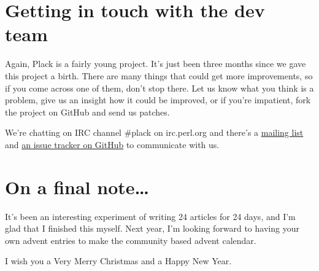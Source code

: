 \section{Getting in touch with the dev
team}\label{getting-in-touch-with-the-dev-team}

Again, Plack is a fairly young project. It's just been three months since we
gave this project a birth. There are many things that could get more
improvements, so if you come across one of them, don't stop there. Let
us know what you think is a problem, give us an insight how it could be
improved, or if you're impatient, fork the project on GitHub and send us
patches.

We're chatting on IRC channel \#plack on irc.perl.org and there's a
\href{http://groups.google.com/group/psgi-plack}{mailing list} and
\href{http://github.com/plack/Plack/issues}{an issue tracker on GitHub}
to communicate with us.

\section{On a final note\ldots{}}\label{on-a-final-note}

It's been an interesting experiment of writing 24 articles for 24 days,
and I'm glad that I finished this myself. Next year, I'm looking forward
to having your own advent entries to make the community based advent
calendar.

I wish you a Very Merry Christmas and a Happy New Year.
